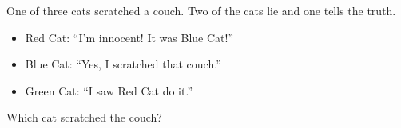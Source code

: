 One of three cats scratched a couch. Two of the cats lie and one tells the truth.
\begin{itemize}
\item Red Cat: ``I'm innocent! It was Blue Cat!''
\item Blue Cat: ``Yes, I scratched that couch.''
\item Green Cat: ``I saw Red Cat do it.''
\end{itemize}
Which cat scratched the couch?
